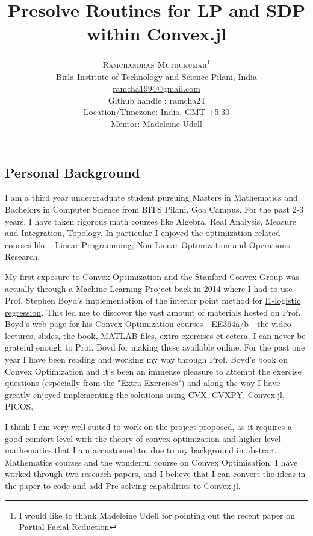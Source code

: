 \documentclass[twoside]{article}
\title{\color{Blue}\vspace{-15mm}\fontsize{24pt}{10pt}\selectfont\textbf{Presolve Routines for LP and SDP within Convex.jl}} %
\author{
\large
\textsc{Ramchandran Muthukumar}\thanks{I would like to thank Madeleine Udell for pointing out the recent paper on Partial Facial Reduction\cite{permenter2014partial}}\\[5mm] %
\normalsize Birla Institute of Technology and Science-Pilani, India \\ %
\normalsize \href{mailto:ramcha1994@gmail.com}{ramcha1994@gmail.com} \\
\normalsize Github handle : ramcha24 \\
\normalsize Location/Timezone: India, GMT +5:30 \\
\normalsize Mentor: Madeleine Udell
\vspace{-5mm}
}
\date{}
\begin{document}
\maketitle %

\thispagestyle{fancy} %


\begin{multicols}{2} %


\section{\textbf{Personal Background}}

\hspace{5mm}I am a third year undergraduate student pursuing Masters in Mathematics and Bachelors in Computer Science from BITS Pilani, Goa Campus. For the past 2-3 years, I have taken rigorous math courses like Algebra, Real Analysis, Measure and Integration, Topology. In particular I enjoyed the optimization-related courses like - Linear Programming, Non-Linear Optimization and Operations Research. 

My first exposure to Convex Optimization and the Stanford Convex Group was actually through a Machine Learning Project back in 2014 where I had to use Prof. Stephen Boyd's implementation of the interior point method for \href{https://stanford.edu/~boyd/l1_logreg/}{l1-logistic regression}. This led me to discover the vast amount of materials hosted on Prof. Boyd's web page for his Convex Optimization courses - EE364a/b - the video lectures, slides, the book, MATLAB files, extra exercises et cetera. I can never be grateful enough to Prof. Boyd for making these available online. For the past one year I have been reading and working my way through Prof. Boyd's book on Convex Optimization and it's been an immense pleasure to attempt the exercise questions (especially from the "Extra Exercises") and along the way I have greatly enjoyed implementing the solutions using CVX, CVXPY, Convex.jl, PICOS. 

I think I am very well suited to work on the project proposed, as it requires a good comfort level with the theory of convex optimization and higher level mathematics that I am accustomed to, due to my background in abstract Mathematics courses and the wonderful course on Convex Optimisation. I have worked through two research papers,  and I believe that I can convert the ideas in the paper to code and add Pre-solving capabilities to Convex.jl.
\vspace*{-\baselineskip}

\end{multicols}
\end{document}
